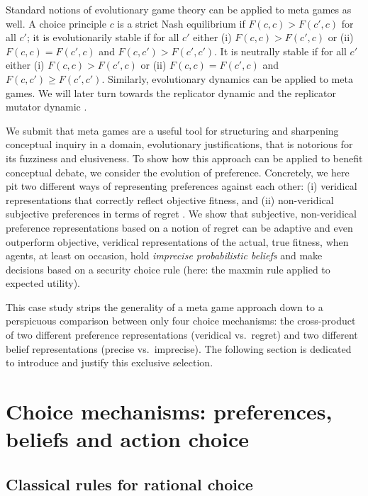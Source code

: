 \documentclass[fleqn,reqno,11pt]{article}
\begin{document}
Standard notions of evolutionary game theory can be applied to meta games as well. A choice
principle $c$ is a strict Nash equilibrium if $F(c,c) > F(c',c)$ for all $c'$; it is
evolutionarily stable if for all $c'$ either (i) $F(c,c) > F(c',c)$ or (ii) $F(c,c) = F(c',c)$
and $F(c,c') > F(c',c')$. It is neutrally stable if for all $c'$ either (i) $F(c,c) > F(c',c)$
or (ii) $F(c,c) = F(c',c)$ and $F(c,c') \ge F(c',c')$. Similarly, evolutionary dynamics can be
applied to meta games. We will later turn towards the replicator dynamic
\citep{TaylorJonker1978:Evolutionary-St} and the replicator mutator dynamic
\citep[e.g.][]{Nowak2006:Evolutionary-Dy}.

We submit that meta games are a useful tool for structuring and sharpening conceptual inquiry
in a domain, evolutionary justifications, that is notorious for its fuzziness and
elusiveness. To show how this approach can be applied to benefit conceptual debate, we consider
the evolution of preference. Concretely, we here pit two different ways of representing
preferences against each other: (i) veridical representations that correctly reflect objective
fitness, and (ii) non-veridical subjective preferences in terms of regret
\citep[e.g.,][]{Savage1951:The-theory-of-s,}. We show that subjective, non-veridical preference
representations based on a notion of regret can be adaptive and even outperform objective,
veridical representations of the actual, true fitness, when agents, at least on occasion, hold
\emph{imprecise probabilistic beliefs} \citep[e.g.,][]{gilsch89,levi74,gardsah82} and make
decisions based on a security choice rule (here: the maxmin rule applied to expected
utility). 

This case study strips the generality of a meta game approach down to a perspicuous comparison
between only four choice mechanisms: the cross-product of two different preference
representations (veridical vs.~regret) and two different belief representations (precise
vs.~imprecise). The following section is dedicated to introduce and justify this exclusive
selection. 


\section{Choice mechanisms: preferences, beliefs and action choice}
\label{sec:basic-notions}

\subsection{Classical rules for rational choice} 
\label{sec:choice-rules}
\end{document}
